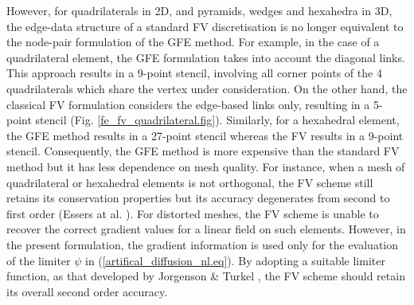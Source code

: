 %
 However, for quadrilaterals in 2D, and pyramids, wedges
 and hexahedra in 3D,
 the edge-data structure of a standard FV discretisation
 is no longer equivalent to the node-pair formulation of the GFE
 method.
 For example, in the case of a quadrilateral element, the GFE formulation
 takes into account the diagonal links. This approach results
 in a 9-point stencil, involving all corner points of the 4 quadrilaterals
 which share the vertex under consideration.
 On the other hand, the classical FV formulation considers the edge-based
 links only, resulting in a 5-point stencil (Fig. \ref{fe_fv_quadrilateral.fig}).
 Similarly, for a hexahedral element, the GFE method results in a 27-point
 stencil whereas the FV results in a 9-point stencil.
 Consequently, the GFE method is more expensive than the standard FV method
 but it has less dependence on mesh quality. For instance, when a mesh
 of quadrilateral or hexahedral elements is not orthogonal,
 the FV scheme still retains its conservation properties but its accuracy
 degenerates from second to first order (Essers at al. ).
 For distorted meshes,
 the FV scheme is unable to recover the correct
 gradient values for a linear field on such elements. However, in the present
 formulation, the gradient information is used only
 for the evaluation of the limiter $\psi$
 in (\ref{artifical_diffusion_nl.eq}).
 By adopting a suitable limiter function, as that developed by Jorgenson \&
 Turkel \citeyear{Turkel:2},
 the FV scheme should retain its overall second order accuracy.
%
%
